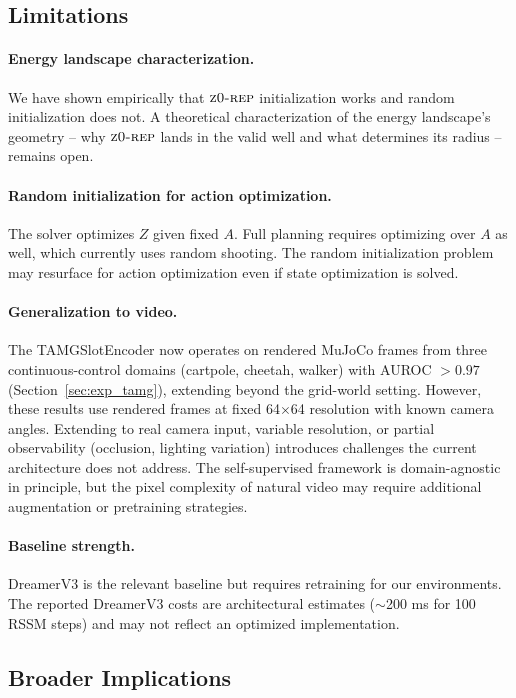 \documentclass[12pt]{article}
\newcommand{\zrep}{\textsc{z0-rep}}
\begin{document}
\subsection{Limitations}

\paragraph{Energy landscape characterization.} We have shown empirically that $\zrep$ initialization works and random initialization does not. A theoretical characterization of the energy landscape's geometry -- why $\zrep$ lands in the valid well and what determines its radius -- remains open.

\paragraph{Random initialization for action optimization.} The solver optimizes $Z$ given fixed $A$. Full planning requires optimizing over $A$ as well, which currently uses random shooting. The random initialization problem may resurface for action optimization even if state optimization is solved.

\paragraph{Generalization to video.} The TAMGSlotEncoder now operates on rendered MuJoCo frames from three continuous-control domains (cartpole, cheetah, walker) with AUROC $> 0.97$ (Section~\ref{sec:exp_tamg}), extending beyond the grid-world setting. However, these results use rendered frames at fixed 64$\times$64 resolution with known camera angles. Extending to real camera input, variable resolution, or partial observability (occlusion, lighting variation) introduces challenges the current architecture does not address. The self-supervised framework is domain-agnostic in principle, but the pixel complexity of natural video may require additional augmentation or pretraining strategies.

\paragraph{Baseline strength.} DreamerV3 is the relevant baseline but requires retraining for our environments. The reported DreamerV3 costs are architectural estimates ($\sim$200 ms for 100 RSSM steps) and may not reflect an optimized implementation.

\subsection{Broader Implications}
\end{document}

